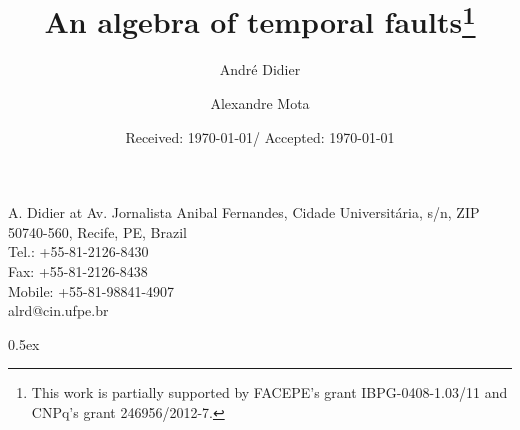 \documentclass{article}
\newcommand{\email}[1]{#1}
\newcommand{\institute}[1]{#1}
\def\at{at}
\begin{document}
\title{An algebra of temporal faults\thanks{This work is partially supported by FACEPE's grant IBPG-0408-1.03/11 and CNPq's grant 246956/2012-7.}}

\author{André Didier \and Alexandre Mota}
\institute{A. Didier \at
              Av. Jornalista Anibal Fernandes, Cidade Universit\'{a}ria, s/n, ZIP 50740-560, Recife, PE, Brazil \\
              Tel.: +55-81-2126-8430\\
              Fax: +55-81-2126-8438\\
              Mobile: +55-81-98841-4907\\
              \email{alrd@cin.ufpe.br}%
}

\date{Received: \today / Accepted: \today}


%
\parindent 0pt\parskip 0.5ex



%

%

%
%
\end{document}
